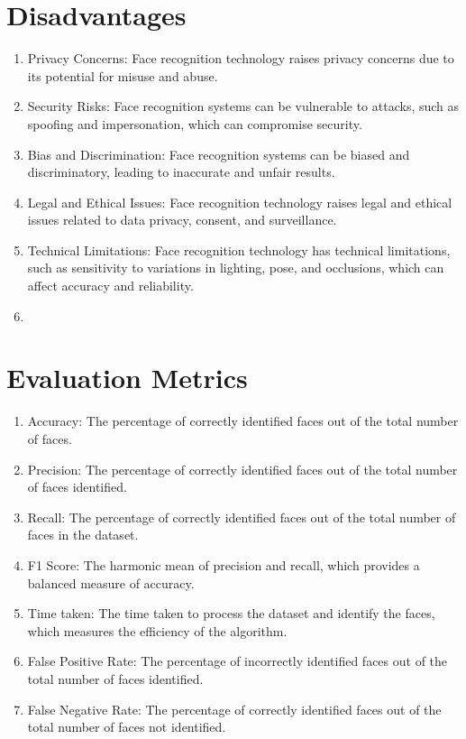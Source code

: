 \documentclass[openany]{report}
\begin{document}
\section{Disadvantages}

\begin{enumerate}
    \item Privacy Concerns: Face recognition technology raises privacy concerns due to its potential for misuse and abuse.
    \item Security Risks: Face recognition systems can be vulnerable to attacks, such as spoofing and impersonation, which can compromise security.
    \item Bias and Discrimination: Face recognition systems can be biased and discriminatory, leading to inaccurate and unfair results.
    \item Legal and Ethical Issues: Face recognition technology raises legal and ethical issues related to data privacy, consent, and surveillance.
    \item Technical Limitations: Face recognition technology has technical limitations, such as sensitivity to variations in lighting, pose, and occlusions, which can affect accuracy and reliability.\item
\end{enumerate}
\section{Evaluation Metrics}

\begin{enumerate}
    \item Accuracy: The percentage of correctly identified faces out of the total number of faces.
    \item Precision: The percentage of correctly identified faces out of the total number of faces identified.
    \item Recall: The percentage of correctly identified faces out of the total number of faces in the dataset.
    \item F1 Score: The harmonic mean of precision and recall, which provides a balanced measure of accuracy.
    \item Time taken: The time taken to process the dataset and identify the faces, which measures the efficiency of the algorithm.
    \item False Positive Rate: The percentage of incorrectly identified faces out of the total number of faces identified.
    \item False Negative Rate: The percentage of correctly identified faces out of the total number of faces not identified.
\end{enumerate}
\end{document}
